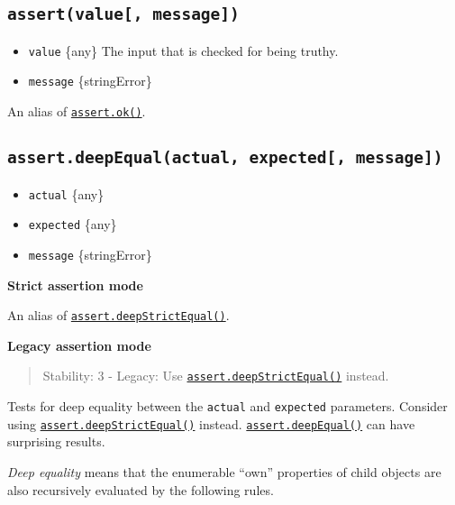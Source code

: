 \subsection{\texorpdfstring{\texttt{assert(value{[},\ message{]})}}{assert(value{[}, message{]})}}\label{assertvalue-message}

\begin{itemize}
\tightlist
\item
  \texttt{value} \{any\} The input that is checked for being truthy.
\item
  \texttt{message} \{string\textbar Error\}
\end{itemize}

An alias of \hyperref[assertokvalue-message]{\texttt{assert.ok()}}.

\subsection{\texorpdfstring{\texttt{assert.deepEqual(actual,\ expected{[},\ message{]})}}{assert.deepEqual(actual, expected{[}, message{]})}}\label{assert.deepequalactual-expected-message}

\begin{itemize}
\tightlist
\item
  \texttt{actual} \{any\}
\item
  \texttt{expected} \{any\}
\item
  \texttt{message} \{string\textbar Error\}
\end{itemize}

\textbf{Strict assertion mode}

An alias of
\hyperref[assertdeepstrictequalactual-expected-message]{\texttt{assert.deepStrictEqual()}}.

\textbf{Legacy assertion mode}

\begin{quote}
Stability: 3 - Legacy: Use
\hyperref[assertdeepstrictequalactual-expected-message]{\texttt{assert.deepStrictEqual()}}
instead.
\end{quote}

Tests for deep equality between the \texttt{actual} and
\texttt{expected} parameters. Consider using
\hyperref[assertdeepstrictequalactual-expected-message]{\texttt{assert.deepStrictEqual()}}
instead.
\hyperref[assertdeepequalactual-expected-message]{\texttt{assert.deepEqual()}}
can have surprising results.

\emph{Deep equality} means that the enumerable ``own'' properties of
child objects are also recursively evaluated by the following rules.

